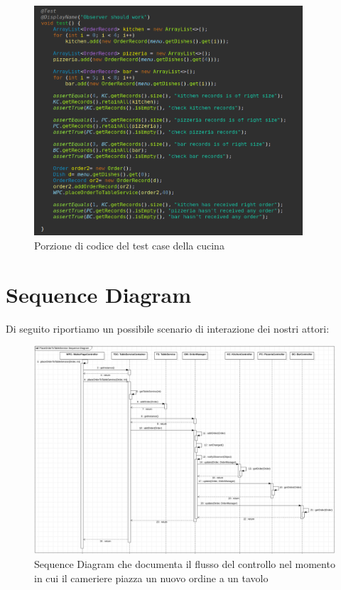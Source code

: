 \documentclass{article}
\begin{document}
\begin{figure}[!h]
\centering
\includegraphics[width= 10cm]{"Codice/TestOrder.PNG"}
\caption{Porzione di codice del test case della cucina}
\end{figure}

\newpage

\section{Sequence Diagram}
Di seguito riportiamo un possibile scenario di interazione dei nostri attori:

\begin{figure}[!h]
\centering
\includegraphics[width= 15cm]{"Immagini/SequenceDiagram.PNG"}
\caption{Sequence Diagram che documenta il flusso del controllo nel momento in cui il cameriere piazza un nuovo ordine a un tavolo}
\label{SequenceDiagram}
\end{figure}
\end{document}
